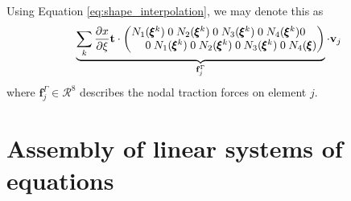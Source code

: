 Using Equation \eqref{eq:shape_interpolation}, we may denote this as 
\begin{equation}
    \underbrace{\sum_k \frac{\partial x}{\partial \xi} \mathbf{t} \cdot \begingroup 
    \setlength\arraycolsep{-5pt}
    \begin{pmatrix}
            N_1(\pmb{\xi}^k) & 0 & N_2(\pmb{\xi}^k) & 0 & N_3(\pmb{\xi}^k) & 0 & N_4(\pmb{\xi}^k) & 0\\
            0 & N_1(\pmb{\xi}^k) & 0 & N_2(\pmb{\xi}^k) & 0 & N_3(\pmb{\xi}^k) & 0 & N_4(\pmb{\xi})\\
    \end{pmatrix} 
    \endgroup}_{\mathbf{f}^\Gamma_j}
    \cdot 
    \mathbf{v}_j
\end{equation}
where $\mathbf{f}^\Gamma_j \in \mathcal{R}^8$ describes the nodal traction forces on element $j$. 

\section{Assembly of linear systems of equations}

